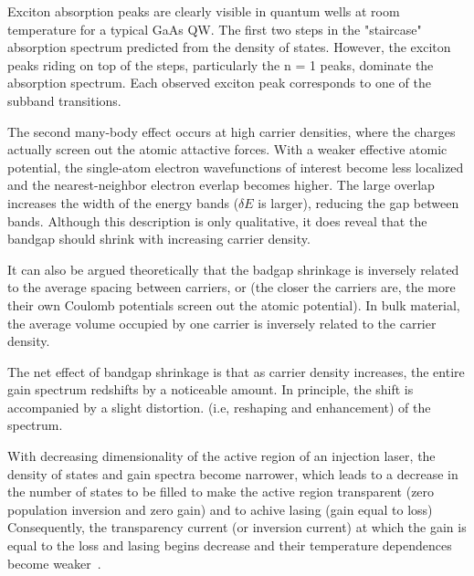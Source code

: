 Exciton absorption peaks are clearly visible in quantum wells at room
temperature for a typical GaAs QW. The first two steps in the "staircase"
absorption spectrum predicted from the density of states. However, the exciton
peaks riding on top of the steps, particularly the n = 1 peaks, dominate the
absorption spectrum. Each observed exciton peak corresponds to one of the
subband transitions.

The second many-body effect occurs at high carrier densities, where the charges
actually screen out the atomic attactive forces. With a weaker effective atomic
potential, the single-atom electron wavefunctions of interest become less
localized and the nearest-neighbor electron everlap becomes higher.  The large
overlap increases the width of the energy bands ($\delta{E}$ is larger),
reducing the gap between bands. Although this description is only qualitative,
it does reveal that the bandgap should shrink with increasing carrier density.

It can also be argued theoretically that the badgap shrinkage is inversely
related to the average spacing between carriers, or (the closer the carriers
are, the more their own Coulomb potentials screen out the atomic potential). In
bulk material, the average volume occupied by one carrier is inversely related
to the carrier density. 

The net effect of bandgap shrinkage is that as carrier density increases, the
entire gain spectrum redshifts by a noticeable amount. In principle, the shift
is accompanied by a slight distortion. (i.e, reshaping and enhancement) of the
spectrum.

With decreasing dimensionality of the active region of an injection laser, the
density of states and gain spectra become narrower, which leads to a decrease
in the number of states to be filled to make the active region transparent
(zero population inversion and zero gain) and to achive lasing (gain equal to
loss) Consequently, the transparency current (or inversion current) at which
the gain is equal to the loss and lasing begins decrease and their temperature
dependences become weaker~\cite{asryan2004theory}.

